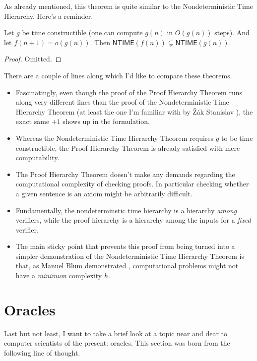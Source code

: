 \documentclass{article}
\theoremstyle{customstyle}
\newenvironment{prf}{\begin{mdframed}[skipabove=5pt, skipbelow=0pt, backgroundcolor=Gray!10, topline=false, bottomline=false, leftline=false, rightline=false]\begin{proof}}{\end{proof}\end{mdframed}}
\begin{document}
As already mentioned, this theorem is quite similar to the Nondeterministic Time Hierarchy. Here's a reminder.

\begin{theorem}
Let $g$ be time constructible (one can compute $g(n)$ in $O(g(n))$ steps). And let $f(n+1) = o(g(n))$. Then $\mathsf{NTIME}(f(n)) \subsetneq \mathsf{NTIME}(g(n))$.
\end{theorem}

\begin{prf}
Omitted.
\end{prf}

There are a couple of lines along which I'd like to compare these theorems.

\begin{itemize}
\item Fascinatingly, even though the proof of the Proof Hierarchy Theorem runs along very different lines than the proof of the Nondeterministic Time Hierarchy Theorem (at least the one I'm familiar with by \v{Z}ák Stanislav \cite{stanislav}), the exact same $+1$ shows up in the formulation.
\item Whereas the Nondeterministic Time Hierarchy Theorem requires $g$ to be time constructible, the Proof Hierarchy Theorem is already satisfied with mere computability.
\item The Proof Hierarchy Theorem doesn't make any demands regarding the computational complexity of checking proofs. In particular checking whether a given sentence is an axiom might be arbitrarily difficult.
\item Fundamentally, the nondeterminstic time hierarchy is a hierarchy \emph{among} verifiers, while the proof hierarchy is a hierarchy among the inputs for a \emph{fixed} verifier.
\item The main sticky point that prevents this proof from being turned into a simpler demonstration of the Nondeterministic Time Hierarchy Theorem is that, as Manuel Blum demonstrated \cite{blum}, computational problems might not have a \emph{minimum} complexity $h$.
\end{itemize}

\section{Oracles}

Last but not least, I want to take a brief look at a topic near and dear to computer scientists of the present: oracles. This section was born from the following line of thought.
\end{document}
